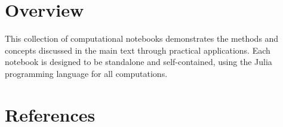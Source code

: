 \documentclass[
  letterpaper,
  DIV=11,
  numbers=noendperiod]{scrreprt}
\begin{document}
\chapter*{Overview}\label{overview-5}


This collection of computational notebooks demonstrates the methods and
concepts discussed in the main text through practical applications. Each
notebook is designed to be standalone and self-contained, using the
Julia programming language for all computations.


\chapter*{References 🎯}\label{references}

\end{document}
